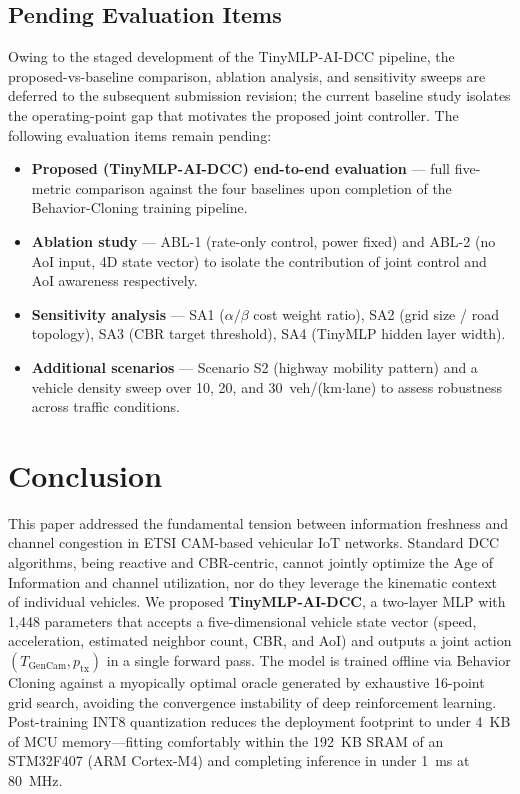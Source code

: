 \documentclass[journal]{IEEEtran}
\begin{document}
\subsection{Pending Evaluation Items}
\label{sec.s_pending}

Owing to the staged development of the TinyMLP-AI-DCC pipeline, the
proposed-vs-baseline comparison, ablation analysis, and sensitivity
sweeps are deferred to the subsequent submission revision; the current
baseline study isolates the operating-point gap that motivates the
proposed joint controller.  The following evaluation items remain
pending:

\begin{itemize}[leftmargin=2em]
  \item \textbf{Proposed (TinyMLP-AI-DCC) end-to-end evaluation} ---
    full five-metric comparison against the four baselines upon
    completion of the Behavior-Cloning training pipeline.
  \item \textbf{Ablation study} --- ABL-1 (rate-only control, power
    fixed) and ABL-2 (no AoI input, 4D state vector) to isolate
    the contribution of joint control and AoI awareness respectively.
  \item \textbf{Sensitivity analysis} --- SA1 ($\alpha/\beta$ cost
    weight ratio), SA2 (grid size / road topology), SA3 (CBR
    target threshold), SA4 (TinyMLP hidden layer width).
  \item \textbf{Additional scenarios} --- Scenario S2 (highway
    mobility pattern) and a vehicle density sweep over
    10, 20, and 30~veh/(km$\cdot$lane) to assess robustness across
    traffic conditions.
\end{itemize}

\section{Conclusion}
\label{sec.c}

This paper addressed the fundamental tension between information
freshness and channel congestion in ETSI CAM-based vehicular IoT
networks.  Standard DCC algorithms, being reactive and CBR-centric,
cannot jointly optimize the Age of Information and channel utilization,
nor do they leverage the kinematic context of individual vehicles.
We proposed \textbf{TinyMLP-AI-DCC}, a two-layer MLP with 1,448
parameters that accepts a five-dimensional vehicle state vector
(speed, acceleration, estimated neighbor count, CBR, and AoI) and
outputs a joint action $(T_{\text{GenCam}}, p_{\text{tx}})$ in a
single forward pass.  The model is trained offline via Behavior
Cloning against a myopically optimal oracle generated by exhaustive
16-point grid search, avoiding the convergence instability of deep
reinforcement learning.  Post-training INT8 quantization reduces the
deployment footprint to under 4~KB of MCU memory---fitting
comfortably within the 192~KB SRAM of an STM32F407 (ARM Cortex-M4)
and completing inference in under 1~ms at 80~MHz.
\end{document}
